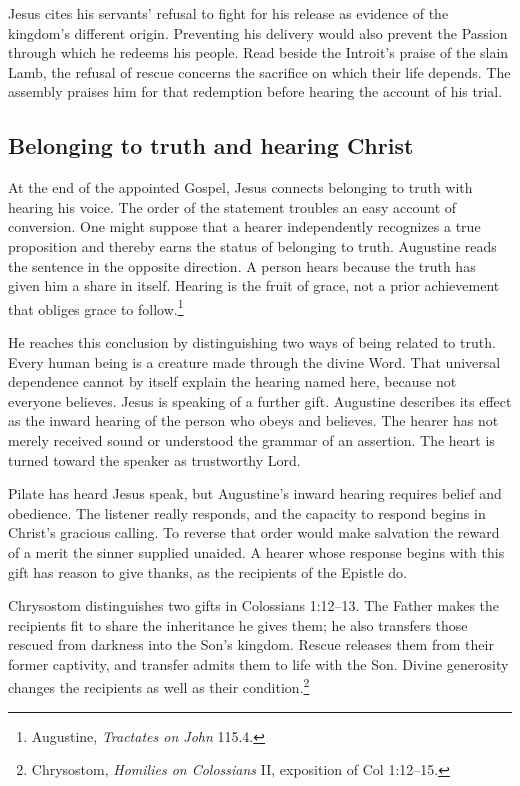 Jesus cites his servants' refusal to fight for his release as evidence of the kingdom's different origin. Preventing his delivery would also prevent the Passion through which he redeems his people. Read beside the Introit's praise of the slain Lamb, the refusal of rescue concerns the sacrifice on which their life depends. The assembly praises him for that redemption before hearing the account of his trial.

\subsection{Belonging to truth and hearing Christ}
At the end of the appointed Gospel, Jesus connects belonging to truth with hearing his voice. The order of the statement troubles an easy account of conversion. One might suppose that a hearer independently recognizes a true proposition and thereby earns the status of belonging to truth. Augustine reads the sentence in the opposite direction. A person hears because the truth has given him a share in itself. Hearing is the fruit of grace, not a prior achievement that obliges grace to follow.\footnote{Augustine, \emph{Tractates on John} 115.4.}

He reaches this conclusion by distinguishing two ways of being related to truth. Every human being is a creature made through the divine Word. That universal dependence cannot by itself explain the hearing named here, because not everyone believes. Jesus is speaking of a further gift. Augustine describes its effect as the inward hearing of the person who obeys and believes. The hearer has not merely received sound or understood the grammar of an assertion. The heart is turned toward the speaker as trustworthy Lord.

Pilate has heard Jesus speak, but Augustine's inward hearing requires belief and obedience. The listener really responds, and the capacity to respond begins in Christ's gracious calling. To reverse that order would make salvation the reward of a merit the sinner supplied unaided. A hearer whose response begins with this gift has reason to give thanks, as the recipients of the Epistle do.

Chrysostom distinguishes two gifts in Colossians 1:12--13. The Father makes the recipients fit to share the inheritance he gives them; he also transfers those rescued from darkness into the Son's kingdom. Rescue releases them from their former captivity, and transfer admits them to life with the Son. Divine generosity changes the recipients as well as their condition.\footnote{Chrysostom, \emph{Homilies on Colossians} II, exposition of Col 1:12--15.}

